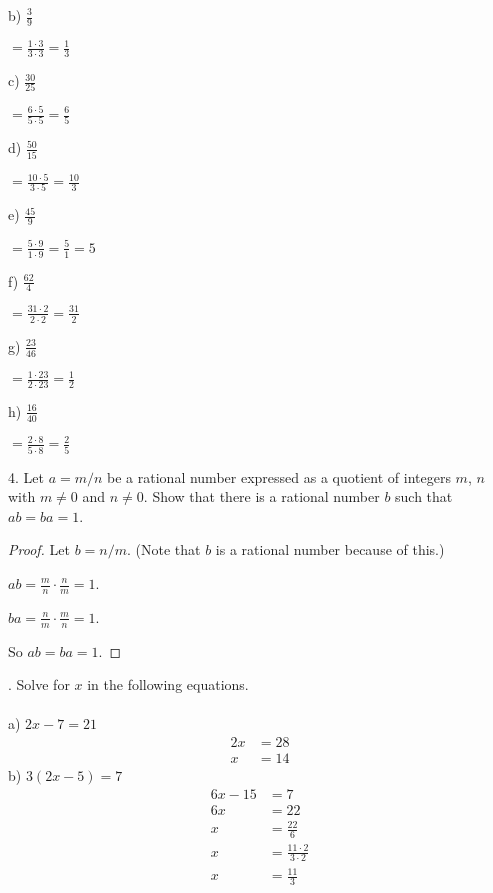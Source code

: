 \documentclass[12pt]{article}
\begin{document}
b) $\displaystyle \frac{3}{9}$
\begin{center}
$=\displaystyle \frac{1\cdot3}{3\cdot3}=\displaystyle \frac{1}{3}$
\end{center}
c) $\displaystyle \frac{30}{25}$
\begin{center}
$=\displaystyle \frac{6\cdot5}{5\cdot5}=\displaystyle \frac{6}{5}$
\end{center}
d) $\displaystyle \frac{50}{15}$
\begin{center}
$=\displaystyle \frac{10\cdot5}{3\cdot5}=\displaystyle \frac{10}{3}$
\end{center}
e) $\displaystyle \frac{45}{9}$
\begin{center}
$=\displaystyle \frac{5\cdot9}{1\cdot9}=\displaystyle \frac{5}{1}=5$
\end{center}
f) $\displaystyle \frac{62}{4}$
\begin{center}
$=\displaystyle \frac{31\cdot2}{2\cdot2}=\displaystyle \frac{31}{2}$
\end{center}
g) $\displaystyle \frac{23}{46}$
\begin{center}
$=\displaystyle \frac{1\cdot23}{2\cdot23}=\displaystyle \frac{1}{2}$
\end{center}
h) $\displaystyle \frac{16}{40}$
\begin{center}
$=\displaystyle \frac{2\cdot8}{5\cdot8}=\displaystyle \frac{2}{5}$
\end{center}
4. Let $a=m/n$ be a rational number expressed as a quotient of integers $m$, $n$ with $m\neq0$ and $n\neq0$. Show that there is a rational number $b$ such that $ab=ba=1$.
\begin{proof}
Let $b = n/m$. (Note that $b$ is a rational number because of this.)
\begin{center}
$ab=\displaystyle \frac{m}{n}\cdot \displaystyle \frac{n}{m} = 1$.
\end{center}
\begin{center}
$ba=\displaystyle \frac{n}{m}\cdot \displaystyle \frac{m}{n} = 1$.
\end{center}
So $ab=ba=1$.
\end{proof}
. Solve for $x$ in the following equations. \\
\\
a) $2x-7=21$
\begin{align*}
2x&=28 \\
x&=14
\end{align*}
b) $3(2x-5)=7$
\begin{align*}
6x-15&=7 \\
6x&=22 \\
x&=\displaystyle \frac{22}{6} \\
x&=\displaystyle \frac{11\cdot2}{3\cdot2} \\
x&=\displaystyle \frac{11}{3}
\end{align*}
\end{document}

